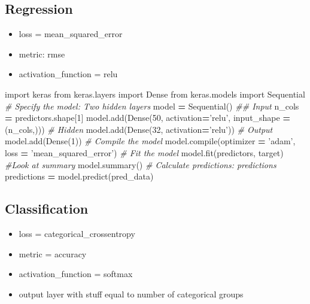 \documentclass[]{book}
\newenvironment{Shaded}{\begin{snugshade}}{\end{snugshade}}
\newcommand{\DecValTok}[1]{\textcolor[rgb]{0.00,0.00,0.81}{#1}}
\newcommand{\StringTok}[1]{\textcolor[rgb]{0.31,0.60,0.02}{#1}}
\newcommand{\ImportTok}[1]{#1}
\newcommand{\CommentTok}[1]{\textcolor[rgb]{0.56,0.35,0.01}{\textit{#1}}}
\newcommand{\OperatorTok}[1]{\textcolor[rgb]{0.81,0.36,0.00}{\textbf{#1}}}
\newcommand{\BuiltInTok}[1]{#1}
\newcommand{\NormalTok}[1]{#1}
\theoremstyle{definition}
\theoremstyle{definition}
\theoremstyle{definition}
\theoremstyle{remark}
\begin{document}
\subsection{Regression}\label{regression}

\begin{itemize}
\item
  loss = mean\_squared\_error
\item
  metric: rmse
\item
  activation\_function = relu
\end{itemize}

\begin{Shaded}
\begin{Highlighting}[]
\ImportTok{import}\NormalTok{ keras}
\ImportTok{from}\NormalTok{ keras.layers }\ImportTok{import}\NormalTok{ Dense}
\ImportTok{from}\NormalTok{ keras.models }\ImportTok{import}\NormalTok{ Sequential}
\CommentTok{# Specify the model: Two hidden layers}
\NormalTok{model }\OperatorTok{=}\NormalTok{ Sequential()}
\CommentTok{## Input}
\NormalTok{n_cols }\OperatorTok{=}\NormalTok{ predictors.shape[}\DecValTok{1}\NormalTok{]}
\NormalTok{model.add(Dense(}\DecValTok{50}\NormalTok{, activation}\OperatorTok{=}\StringTok{'relu'}\NormalTok{, input_shape }\OperatorTok{=}\NormalTok{ (n_cols,)))}
\CommentTok{# Hidden}
\NormalTok{model.add(Dense(}\DecValTok{32}\NormalTok{, activation}\OperatorTok{=}\StringTok{'relu'}\NormalTok{))}
\CommentTok{# Output}
\NormalTok{model.add(Dense(}\DecValTok{1}\NormalTok{))}
\CommentTok{# Compile the model}
\NormalTok{model.}\BuiltInTok{compile}\NormalTok{(optimizer }\OperatorTok{=} \StringTok{'adam'}\NormalTok{, loss }\OperatorTok{=} \StringTok{'mean_squared_error'}\NormalTok{) }
\CommentTok{# Fit the model}
\NormalTok{model.fit(predictors, target)}
\CommentTok{#Look at summary}
\NormalTok{model.summary()}
\CommentTok{# Calculate predictions: predictions}
\NormalTok{predictions }\OperatorTok{=}\NormalTok{ model.predict(pred_data)}
\end{Highlighting}
\end{Shaded}

\subsection{Classification}\label{classification}

\begin{itemize}
\item
  loss = categorical\_crossentropy
\item
  metric = accuracy
\item
  activation\_function = softmax
\item
  output layer with stuff equal to number of categorical groups
\end{itemize}
\end{document}
